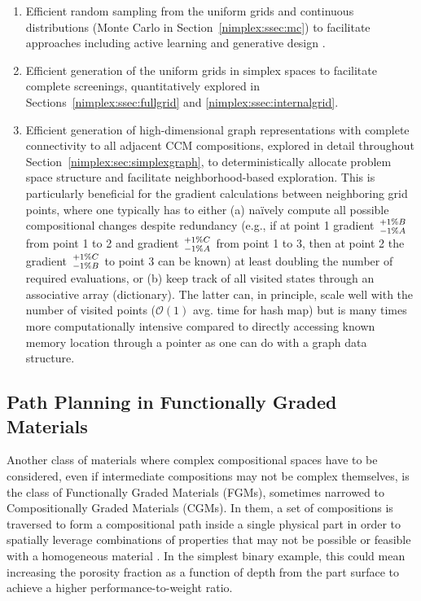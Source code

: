 \begin{enumerate}

    \item Efficient random sampling from the uniform grids and continuous distributions (Monte Carlo in Section~\ref{nimplex:ssec:mc}) to facilitate approaches including active learning \cite{Rao2022MachineDiscovery} and generative design \cite{Debnath2021GenerativeAlloys}.
    
    \item Efficient generation of the uniform grids in simplex spaces to facilitate complete screenings, quantitatively explored in Sections~\ref{nimplex:ssec:fullgrid} and \ref{nimplex:ssec:internalgrid}.
    
    \item Efficient generation of high-dimensional graph representations with complete connectivity to all adjacent CCM compositions, explored in detail throughout Section~\ref{nimplex:sec:simplexgraph}, to deterministically allocate problem space structure and facilitate neighborhood-based exploration. This is particularly beneficial for the gradient calculations between neighboring grid points, where one typically has to either (a) na\"ively compute all possible compositional changes despite redundancy (e.g., if at point 1 gradient $+1\%B \atop -1\%A$ from point 1 to 2 and gradient $+1\%C \atop -1\%A$ from point 1 to 3, then at point 2 the gradient $+1\%C \atop -1\%B$ to point 3 can be known) at least doubling the number of required evaluations, or (b) keep track of all visited states through an associative array (dictionary). The latter can, in principle, scale well with the number of visited points ($\mathcal{O}(1)$ avg. time for hash map) but is many times more computationally intensive compared to directly accessing known memory location through a pointer as one can do with a graph data structure.
    
\end{enumerate}


\subsection{Path Planning in Functionally Graded Materials} \label{nimplex:ssec:functionallygraded}

Another class of materials where complex compositional spaces have to be considered, even if intermediate compositions may not be complex themselves, is the class of Functionally Graded Materials (FGMs), sometimes narrowed to Compositionally Graded Materials (CGMs). In them, a set of compositions is traversed to form a compositional path inside a single physical part in order to spatially leverage combinations of properties that may not be possible or feasible with a homogeneous material \cite{Saleh202030Challenges}. In the simplest binary example, this could mean increasing the porosity fraction as a function of depth from the part surface to achieve a higher performance-to-weight ratio. 


